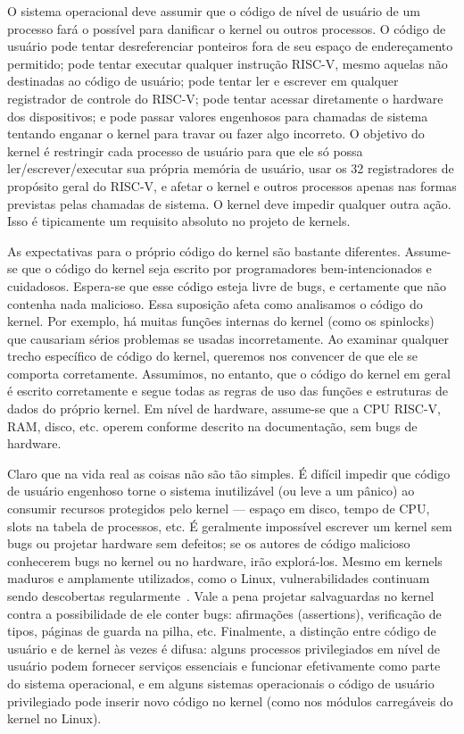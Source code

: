 O sistema operacional deve assumir que o código de nível de usuário de um processo fará o possível para danificar o kernel ou outros processos. O código de usuário pode tentar desreferenciar ponteiros fora de seu espaço de endereçamento permitido; pode tentar executar qualquer instrução RISC-V, mesmo aquelas não destinadas ao código de usuário; pode tentar ler e escrever em qualquer registrador de controle do RISC-V; pode tentar acessar diretamente o hardware dos dispositivos; e pode passar valores engenhosos para chamadas de sistema tentando enganar o kernel para travar ou fazer algo incorreto. O objetivo do kernel é restringir cada processo de usuário para que ele só possa ler/escrever/executar sua própria memória de usuário, usar os 32 registradores de propósito geral do RISC-V, e afetar o kernel e outros processos apenas nas formas previstas pelas chamadas de sistema. O kernel deve impedir qualquer outra ação. Isso é tipicamente um requisito absoluto no projeto de kernels.

As expectativas para o próprio código do kernel são bastante diferentes. Assume-se que o código do kernel seja escrito por programadores bem-intencionados e cuidadosos. Espera-se que esse código esteja livre de bugs, e certamente que não contenha nada malicioso. Essa suposição afeta como analisamos o código do kernel. Por exemplo, há muitas funções internas do kernel (como os spinlocks) que causariam sérios problemas se usadas incorretamente. Ao examinar qualquer trecho específico de código do kernel, queremos nos convencer de que ele se comporta corretamente. Assumimos, no entanto, que o código do kernel em geral é escrito corretamente e segue todas as regras de uso das funções e estruturas de dados do próprio kernel. Em nível de hardware, assume-se que a CPU RISC-V, RAM, disco, etc. operem conforme descrito na documentação, sem bugs de hardware.

Claro que na vida real as coisas não são tão simples. É difícil impedir que código de usuário engenhoso torne o sistema inutilizável (ou leve a um pânico) ao consumir recursos protegidos pelo kernel — espaço em disco, tempo de CPU, slots na tabela de processos, etc. É geralmente impossível escrever um kernel sem bugs ou projetar hardware sem defeitos; se os autores de código malicioso conhecerem bugs no kernel ou no hardware, irão explorá-los. Mesmo em kernels maduros e amplamente utilizados, como o Linux, vulnerabilidades continuam sendo descobertas regularmente~\cite{mitre:cves}. Vale a pena projetar salvaguardas no kernel contra a possibilidade de ele conter bugs: afirmações (assertions), verificação de tipos, páginas de guarda na pilha, etc. Finalmente, a distinção entre código de usuário e de kernel às vezes é difusa: alguns processos privilegiados em nível de usuário podem fornecer serviços essenciais e funcionar efetivamente como parte do sistema operacional, e em alguns sistemas operacionais o código de usuário privilegiado pode inserir novo código no kernel (como nos módulos carregáveis do kernel no Linux).

